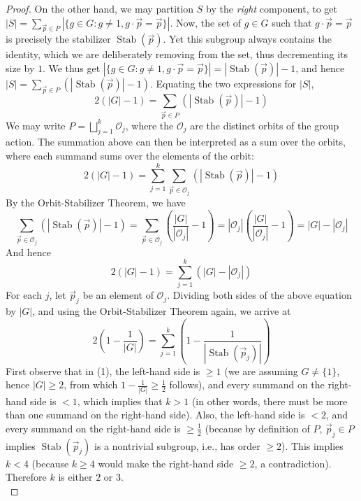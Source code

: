 \documentclass[leqno]{book}
\begin{document}
\begin{proof}
On the other hand, we may partition $S$ by the \emph{right} component, to get $|S|=\sum_{\vec p\in P}|\{g\in G:g\ne 1,g\cdot\vec p=\vec p\}|$.  Now, the set of $g\in G$ such that $g\cdot\vec p=\vec p$ is precisely the stabilizer $\operatorname{Stab}(\vec p)$.  Yet this subgroup always contains the identity, which we are deliberately removing from the set, thus decrementing its size by $1$.  We thus get $|\{g\in G:g\ne 1,g\cdot\vec p=\vec p\}|=|\operatorname{Stab}(\vec p)|-1$, and hence $|S|=\sum_{\vec p\in P}(|\operatorname{Stab}(\vec p)|-1)$.  Equating the two expressions for $|S|$,
$$2(|G|-1)=\sum_{\vec p\in P}(|\operatorname{Stab}(\vec p)|-1)$$
We may write $P=\bigsqcup_{j=1}^k\mathcal O_j$, where the $\mathcal O_j$ are the distinct orbits of the group action.  The summation above can then be interpreted as a sum over the orbits, where each summand sums over the elements of the orbit:
$$2(|G|-1)=\sum_{j=1}^k\sum_{\vec p\in\mathcal O_j}(|\operatorname{Stab}(\vec p)|-1)$$
By the Orbit-Stabilizer Theorem, we have
$$\sum_{\vec p\in\mathcal O_j}(|\operatorname{Stab}(\vec p)|-1)=\sum_{\vec p\in\mathcal O_j}\left(\frac{|G|}{|\mathcal O_j|}-1\right)=|\mathcal O_j|\left(\frac{|G|}{|\mathcal O_j|}-1\right)=|G|-|\mathcal O_j|$$
And hence
$$2(|G|-1)=\sum_{j=1}^k(|G|-|\mathcal O_j|)$$
For each $j$, let $\vec p_j$ be an element of $\mathcal O_j$.  Dividing both sides of the above equation by $|G|$, and using the Orbit-Stabilizer Theorem again, we arrive at
\begin{equation}\tag{1}
2\left(1-\frac 1{|G|}\right)=\sum_{j=1}^k\left(1-\frac 1{|\operatorname{Stab}(\vec p_j)|}\right)
\end{equation}
First observe that in (1), the left-hand side is $\geqslant 1$ (we are assuming $G\ne\{1\}$, hence $|G|\geqslant 2$, from which $1-\frac 1{|G|}\geqslant\frac 12$ follows), and every summand on the right-hand side is $<1$, which implies that $k>1$ (in other words, there must be more than one summand on the right-hand side).  Also, the left-hand side is $<2$, and every summand on the right-hand side is $\geqslant\frac 12$ (because by definition of $P$, $\vec p_j\in P$ implies $\operatorname{Stab}(\vec p_j)$ is a nontrivial subgroup, i.e., has order $\geqslant 2$).  This implies $k<4$ (because $k\geqslant 4$ would make the right-hand side $\geqslant 2$, a contradiction).  Therefore $k$ is either $2$ or $3$.\\


\end{proof}
\end{document}
